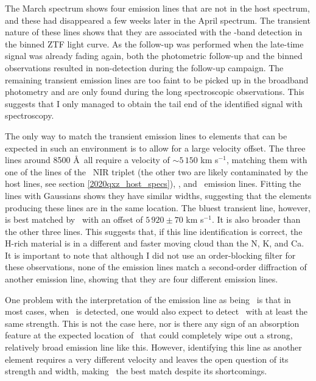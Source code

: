 \documentclass[a4paper,oneside,12pt, class=Latex/Classes/PhDthesisPSnPDF, crop=false]{standalone}
\begin{document}
The March spectrum shows four emission lines that are not in the host spectrum, and these had disappeared a few weeks later in the April spectrum. The transient nature of these lines shows that they are associated with the \ztfi-band detection in the binned ZTF light curve. As the follow-up was performed when the late-time signal was already fading again, both the photometric follow-up and the binned observations resulted in non-detection during the follow-up campaign. The remaining transient emission lines are too faint to be picked up in the broadband photometry and are only found during the long spectroscopic observations. This suggests that I only managed to obtain the tail end of the identified signal with spectroscopy.

The only way to match the transient emission lines to elements that can be expected in such an environment is to allow for a large velocity offset. The three lines around 8500 \AA\ all require a velocity of $\sim5\,150$ km s$^{-1}$, matching them with one of the lines of the \CaII\ NIR triplet (the other two are likely contaminated by the host lines, see section \ref{2020qxz_host_specs}), \NI, and \KI\ emission lines. Fitting the lines with Gaussians shows they have similar widths, suggesting that the elements producing these lines are in the same location. The bluest transient line, however, is best matched by \Hbeta\ with an offset of $5\,920\pm70$ km s$^{-1}$. It is also broader than the other three lines. This suggests that, if this line identification is correct, the H-rich material is in a different and faster moving cloud than the N, K, and Ca. It is important to note that although I did not use an order-blocking filter for these observations, none of the emission lines match a second-order diffraction of another emission line, showing that they are four different emission lines.

One problem with the interpretation of the emission line as being \Hbeta\ is that in most cases, when \Hbeta\ is detected, one would also expect to detect \Halpha\ with at least the same strength. This is not the case here, nor is there any sign of an absorption feature at the expected location of \Halpha\ that could completely wipe out a strong, relatively broad emission line like this. However, identifying this line as another element requires a very different velocity and leaves the open question of its strength and width, making \Hbeta\ the best match despite its shortcomings.
\end{document}
